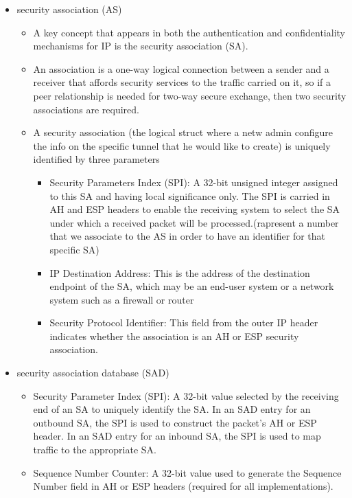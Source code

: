 \documentclass{article}
\begin{document}
\begin{itemize}
    \item security association (AS)
    \begin{itemize}
        \item A key concept that appears in both the authentication and confidentiality mechanisms for IP is the security association (SA).
        \item An association is a one-way logical connection between a sender and a receiver that affords security services to the traffic carried on it, so if a peer relationship is needed for two-way secure exchange, then two security associations are required.
        \item A security association (the logical struct where a netw admin configure the info on the specific tunnel that he would like to create) is uniquely identified by three parameters
        \begin{itemize}
            \item Security Parameters Index (SPI): A 32-bit unsigned integer assigned to this SA and having local significance only. The SPI is carried in AH and ESP headers to enable the receiving system to select the SA under which a received packet will be processed.(rapresent a number that we associate to the AS in order to have an identifier for that specific SA)           
            \item IP Destination Address: This is the address of the destination endpoint of the SA, which may be an end-user system or a network system such as a firewall or router
            \item Security Protocol Identifier: This field from the outer IP header indicates whether the association is an AH or ESP security association.
        \end{itemize} 
    \end{itemize}
    \item security association database (SAD)
    \begin{itemize}
        \item Security Parameter Index (SPI): A 32-bit value selected by the receiving end of an SA to uniquely identify the SA. In an SAD entry for an outbound SA, the SPI is used to construct the packet’s AH or ESP header. In an SAD entry for an inbound SA, the SPI is used to map traffic to the appropriate SA.
        \item Sequence Number Counter: A 32-bit value used to generate the Sequence Number field in AH or ESP headers (required for all implementations). 

\end{itemize}
\end{itemize}
\end{document}
